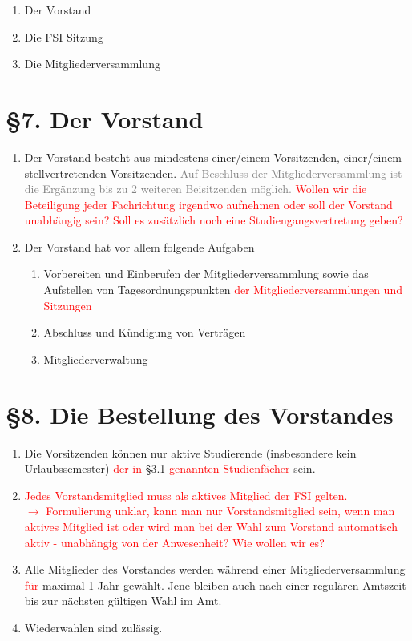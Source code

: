 \documentclass[a4paper,12pt]{article}
\newcommand{\red}[1]{\textcolor{red}{#1}}
\newcommand{\gray}[1]{\textcolor{gray}{#1}}
\begin{document}
\begin{enumerate}
	\item
		Der Vorstand
	\item
		Die FSI Sitzung
	\item
		Die Mitgliederversammlung
\end{enumerate}

\section*{§7. Der Vorstand}

\begin{enumerate}
    	\item
		Der Vorstand besteht aus mindestens einer/einem Vorsitzenden,
		einer/einem stellvertretenden Vorsitzenden. \gray{Auf Beschluss der
		Mitgliederversammlung ist die Ergänzung bis zu 2 weiteren
		Beisitzenden möglich.}
		\red{Wollen wir die Beteiligung jeder Fachrichtung irgendwo aufnehmen oder soll der Vorstand unabhängig sein? Soll es zusätzlich noch eine Studiengangsvertretung geben?}
    	\item
		Der Vorstand hat vor allem folgende Aufgaben
    		\begin{enumerate}[label=(\roman*)]
			\item
				Vorbereiten und Einberufen der
				Mitgliederversammlung sowie das Aufstellen von
				Tagesordnungspunkten \red{der Mitgliederversammlungen und Sitzungen}
        		\item
				Abschluss und Kündigung von Verträgen
        		\item
				Mitgliederverwaltung
    		\end{enumerate}
\end{enumerate}

\section*{§8. Die Bestellung des Vorstandes}

\begin{enumerate}
	\item
		Die Vorsitzenden können nur aktive Studierende (insbesondere
		kein Urlaubssemester) \red{der in \hyperref[3.1]{§3.1} genannten Studienfächer} sein. 
	\item
		\red{Jedes Vorstandsmitglied muss als aktives Mitglied der FSI gelten. \\
			$\rightarrow$ Formulierung unklar, kann man nur Vorstandsmitglied sein, wenn man aktives Mitglied ist oder wird man bei der Wahl zum Vorstand automatisch aktiv - unabhängig von der Anwesenheit? Wie wollen wir es?}
	\item
		Alle Mitglieder des Vorstandes werden während einer
		Mitgliederversammlung \red{für} maximal 1 Jahr gewählt. Jene bleiben
		auch nach einer regulären Amtszeit bis zur nächsten gültigen
		Wahl im Amt.
	\item
		Wiederwahlen sind zulässig.
\end{enumerate}
\end{document}
